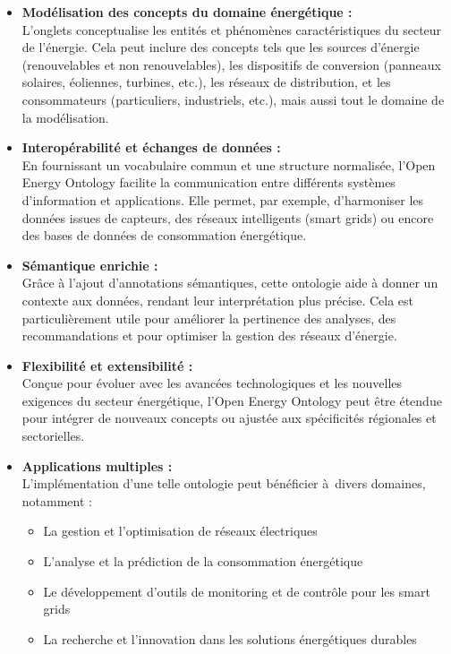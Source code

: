 \documentclass[a4paper,11pt]{report}
\providecommand{\tightlist}{\setlength{\itemsep}{0pt}\setlength{\parskip}{0pt}}
\begin{document}
\begin{itemize}
\item
  \textbf{Modélisation des concepts du domaine énergétique :}\\
  L'onglets conceptualise les entités et phénomènes caractéristiques du secteur de l'énergie. Cela peut inclure des concepts tels que les sources d'énergie (renouvelables et non renouvelables), les dispositifs de conversion (panneaux solaires, éoliennes, turbines, etc.), les réseaux de distribution, et les consommateurs (particuliers, industriels, etc.), mais aussi tout le domaine de la modélisation.
\item
  \textbf{Interopérabilité et échanges de données :}\\
  En fournissant un vocabulaire commun et une structure normalisée, l'Open Energy Ontology facilite la communication entre différents systèmes d'information et applications. Elle permet, par exemple, d'harmoniser les données issues de capteurs, des réseaux intelligents (smart grids) ou encore des bases de données de consommation énergétique.
\item
  \textbf{Sémantique enrichie :}\\
  Grâce à l'ajout d'annotations sémantiques, cette ontologie aide à donner un contexte aux données, rendant leur interprétation plus précise. Cela est particulièrement utile pour améliorer la pertinence des analyses, des recommandations et pour optimiser la gestion des réseaux d'énergie.
\item
  \textbf{Flexibilité et extensibilité :}\\
  Conçue pour évoluer avec les avancées technologiques et les nouvelles exigences du secteur énergétique, l'Open Energy Ontology peut être étendue pour intégrer de nouveaux concepts ou ajustée aux spécificités régionales et sectorielles.
\item
  \textbf{Applications multiples :}\\
  L'implémentation d'une telle ontologie peut bénéficier à~divers domaines, notamment :

  \begin{itemize}
  \tightlist
  \item
    La gestion et l'optimisation de réseaux électriques
  \item
    L'analyse et la prédiction de la consommation énergétique
  \item
    Le développement d'outils de monitoring et de contrôle pour les smart grids
  \item
    La recherche et l'innovation dans les solutions énergétiques durables
  \end{itemize}
\end{itemize}
\end{document}

